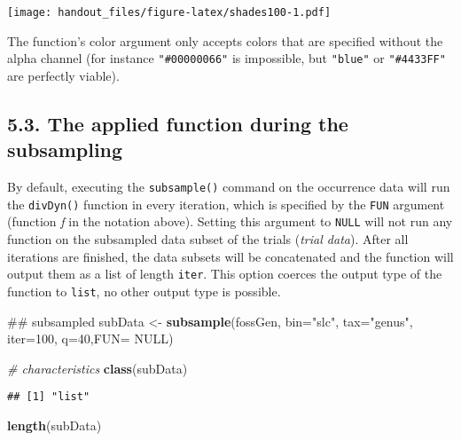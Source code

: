 \documentclass[]{article}
\newenvironment{Shaded}{\begin{snugshade}}{\end{snugshade}}
\newcommand{\CommentTok}[1]{\textcolor[rgb]{0.56,0.35,0.01}{\textit{#1}}}
\newcommand{\DataTypeTok}[1]{\textcolor[rgb]{0.13,0.29,0.53}{#1}}
\newcommand{\DecValTok}[1]{\textcolor[rgb]{0.00,0.00,0.81}{#1}}
\newcommand{\KeywordTok}[1]{\textcolor[rgb]{0.13,0.29,0.53}{\textbf{#1}}}
\newcommand{\NormalTok}[1]{#1}
\newcommand{\OtherTok}[1]{\textcolor[rgb]{0.56,0.35,0.01}{#1}}
\newcommand{\StringTok}[1]{\textcolor[rgb]{0.31,0.60,0.02}{#1}}
\begin{document}
\texttt{[image: handout\_files/figure-latex/shades100-1.pdf]}

The function's color argument only accepts colors that are specified
without the alpha channel (for instance \texttt{"\#00000066"} is
impossible, but \texttt{"blue"} or \texttt{"\#4433FF"} are perfectly
viable).

\hypertarget{the-applied-function-during-the-subsampling}{%
\subsection{5.3. The applied function during the
subsampling}\label{the-applied-function-during-the-subsampling}}

By default, executing the \texttt{subsample()} command on the occurrence
data will run the \texttt{divDyn()} function in every iteration, which
is specified by the \texttt{FUN} argument (function \emph{f} in the
notation above). Setting this argument to \texttt{NULL} will not run any
function on the subsampled data subset of the trials (\emph{trial
data}). After all iterations are finished, the data subsets will be
concatenated and the function will output them as a list of length
\texttt{iter}. This option coerces the output type of the function to
\texttt{list}, no other output type is possible.

\begin{Shaded}
\begin{Highlighting}[]
\NormalTok{## subsampled }
\NormalTok{subData <-}\StringTok{ }\KeywordTok{subsample}\NormalTok{(fossGen, }\DataTypeTok{bin=}\StringTok{"slc"}\NormalTok{, }\DataTypeTok{tax=}\StringTok{"genus"}\NormalTok{, }
  \DataTypeTok{iter=}\DecValTok{100}\NormalTok{, }\DataTypeTok{q=}\DecValTok{40}\NormalTok{,}\DataTypeTok{FUN=} \OtherTok{NULL}\NormalTok{)}
\end{Highlighting}
\end{Shaded}

\begin{Shaded}
\begin{Highlighting}[]
\CommentTok{# characteristics}
\KeywordTok{class}\NormalTok{(subData)}
\end{Highlighting}
\end{Shaded}

\begin{verbatim}
## [1] "list"
\end{verbatim}

\begin{Shaded}
\begin{Highlighting}[]
\KeywordTok{length}\NormalTok{(subData)}
\end{Highlighting}
\end{Shaded}
\end{document}
